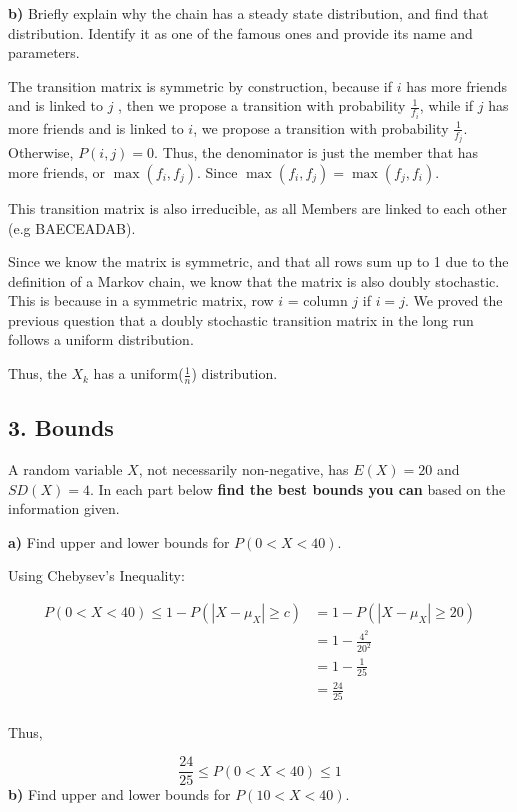 \documentclass[11pt]{article}
\begin{document}
\textbf{b)} Briefly explain why the chain has a steady state
distribution, and find that distribution. Identify it as one of the
famous ones and provide its name and parameters.


The transition matrix is symmetric by construction, because if $ i $ has more friends and is linked to $ j $ , then we propose a transition with probability $ \frac{1}{f_{i}} $, while if $ j $ has more friends and is linked to $ i $, we propose a transition with probability $ \frac{1}{f_{j}}$. Otherwise, $ P(i,j) = 0 $. Thus, the denominator is just the member that has more friends, or $ \max(f_{i}, f_{j}) $. Since $ \max(f_{i}, f_{j}) = \max(f_{j}, f_{i}) $. 

This transition matrix is also irreducible, as all Members are linked to each other (e.g BAECEADAB). 

Since we know the matrix is symmetric, and that all rows sum up to 1 due to the definition of a Markov chain, we know that the matrix is also doubly stochastic. This is because in a symmetric matrix, row $ i $ = column $ j $ if $ i=j $. We proved the previous question that a doubly stochastic transition matrix in the long run follows a uniform distribution. 

Thus, the $ X_k$ has a uniform($ \frac{1}{n} $) distribution. 


    \newpage

    \subsection{3. Bounds}\label{bounds}

A random variable \(X\), not necessarily non-negative, has \(E(X) = 20\)
and \(SD(X) = 4\). In each part below \textbf{find the best bounds you
can} based on the information given.

\textbf{a)} Find upper and lower bounds for \(P(0 < X < 40)\).

Using Chebysev's Inequality: 

\begin{align*}
	P(0<X<40) \le 1 - P(|X - \mu _{X}| \ge c) &=  1 - P(|X - \mu _{X}| \ge 20)  \\
	&= 1 - \frac{4^{2}}{20^{2}} \\
	&= 1 - \frac{1}{25} \\
	&= \frac{24}{25} \\
\end{align*}


Thus, 

\[
	\boxed{\frac{24}{25} \le P(0< X< 40) \le 1}
\]
\textbf{b)} Find upper and lower bounds for \(P(10 < X < 40)\).
\end{document}
